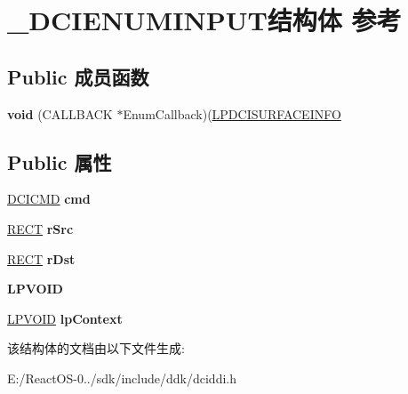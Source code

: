 \hypertarget{struct___d_c_i_e_n_u_m_i_n_p_u_t}{}\section{\+\_\+\+D\+C\+I\+E\+N\+U\+M\+I\+N\+P\+U\+T结构体 参考}
\label{struct___d_c_i_e_n_u_m_i_n_p_u_t}
\subsection*{Public 成员函数}
\begin{DoxyCompactItemize}
\item 
\mbox{\label{struct___d_c_i_e_n_u_m_i_n_p_u_t_a2205fedc053ee5b78098ffed261a341c}} 
{\bfseries void} (C\+A\+L\+L\+B\+A\+CK $\ast$Enum\+Callback)(\hyperlink{struct___d_c_i_s_u_r_f_a_c_e_i_n_f_o}{L\+P\+D\+C\+I\+S\+U\+R\+F\+A\+C\+E\+I\+N\+FO}
\end{DoxyCompactItemize}
\subsection*{Public 属性}
\begin{DoxyCompactItemize}
\item 
\mbox{\label{struct___d_c_i_e_n_u_m_i_n_p_u_t_aeba28dc4c31ca137f610f807532fbf9c}} 
\hyperlink{struct___d_c_i_c_m_d}{D\+C\+I\+C\+MD} {\bfseries cmd}
\item 
\mbox{\label{struct___d_c_i_e_n_u_m_i_n_p_u_t_ac849ebae959a3bade2bc3abd61eb5731}} 
\hyperlink{structtag_r_e_c_t}{R\+E\+CT} {\bfseries r\+Src}
\item 
\mbox{\label{struct___d_c_i_e_n_u_m_i_n_p_u_t_a058e183f117f495e0ee465162b69909f}} 
\hyperlink{structtag_r_e_c_t}{R\+E\+CT} {\bfseries r\+Dst}
\item 
\mbox{\label{struct___d_c_i_e_n_u_m_i_n_p_u_t_a10efc2dc36ab48945c4f55ffc34d698c}} 
{\bfseries L\+P\+V\+O\+ID}
\item 
\mbox{\label{struct___d_c_i_e_n_u_m_i_n_p_u_t_a2ed24cb5b44877a29ff4ec34037f0dd1}} 
\hyperlink{interfacevoid}{L\+P\+V\+O\+ID} {\bfseries lp\+Context}
\end{DoxyCompactItemize}


该结构体的文档由以下文件生成\+:\begin{DoxyCompactItemize}
\item 
E\+:/\+React\+O\+S-\/0../sdk/include/ddk/dciddi.\+h\end{DoxyCompactItemize}
